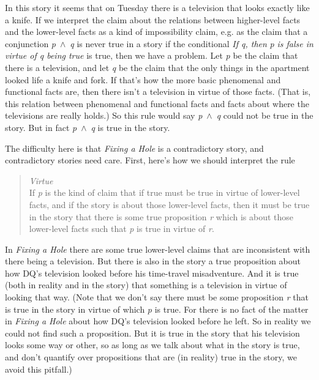 \noindent In this story it seems that on Tuesday there is a television that looks exactly like a knife. If we interpret the claim about the relations between higher-level facts and the lower-level facts as a kind of impossibility claim, e.g. as the claim that a conjunction \textit{p}~${\wedge}$~\textit{q} is never true in a story if the conditional \textit{If q, then} \textit{p} \textit{is false in virtue of q being true} is true, then we have a problem. Let \textit{p} be the claim that there is a television, and let \textit{q} be the claim that the only things in the apartment looked life a knife and fork. If that's how the more basic phenomenal and functional facts are, then there isn't a television in virtue of those facts. (That is, this relation between phenomenal and functional facts and facts about where the televisions are really holds.) So this rule would say \textit{p}~${\wedge}$~\textit{q} could not be true in the story. But in fact \textit{p}~${\wedge}$~\textit{q} is true in the story.

The difficulty here is that \textit{Fixing a Hole} is a contradictory story, and contradictory stories need care. First, here's how we should interpret the rule

\begin{quote}
\textit{Virtue} \\
If \textit{p} is the kind of claim that if true must be true in virtue of lower-level facts, and if the story is about those lower-level facts, then it must be true in the story that there is some true proposition \textit{r} which is about those lower-level facts such that \textit{p} is true in virtue of \textit{r}.
\end{quote}

In \textit{Fixing a Hole} there are some true lower-level claims that are inconsistent with there being a television. But there is also in the story a true proposition about how DQ's television looked before his time-travel misadventure. And it is true (both in reality and in the story) that something is a television in virtue of looking that way. (Note that we don't say there must be some proposition \textit{r} that is true in the story in virtue of which \textit{p} is true. For there is no fact of the matter in \textit{Fixing a Hole} about how DQ's television looked before he left. So in reality we could not find such a proposition. But it is true in the story that his television looks some way or other, so as long as we talk about what in the story is true, and don't quantify over propositions that are (in reality) true in the story, we avoid this pitfall.)

